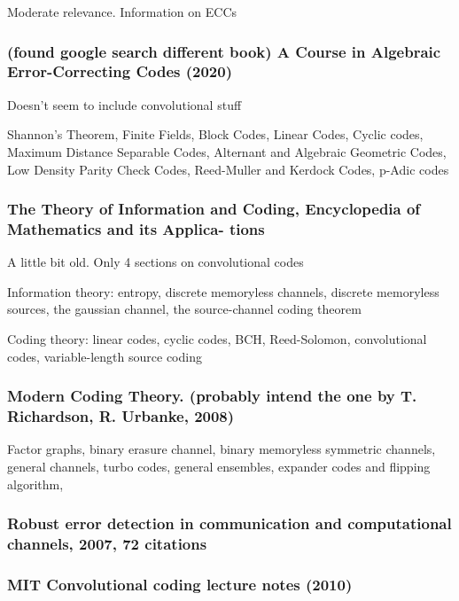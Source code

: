 \documentclass{article}
\begin{document}
Moderate relevance. Information on ECCs

\subsubsection{(found google search different book) A Course in Algebraic Error-Correcting Codes (2020)}

Doesn't seem to include convolutional stuff

Shannon's Theorem, Finite Fields, Block Codes, Linear Codes, Cyclic codes, Maximum Distance Separable Codes, Alternant and Algebraic Geometric Codes, Low Density Parity Check Codes, Reed-Muller and Kerdock Codes, p-Adic codes

\subsubsection{The Theory of Information and Coding, Encyclopedia of Mathematics and its Applica-
tions}

A little bit old. Only 4 sections on convolutional codes

Information theory: entropy, discrete memoryless channels, discrete memoryless sources, the gaussian channel, the source-channel coding theorem

Coding theory: linear codes, cyclic codes, BCH, Reed-Solomon, convolutional codes, variable-length source coding


\subsubsection{Modern Coding Theory. (probably intend the one by T. Richardson, R. Urbanke, 2008)}

Factor graphs, binary erasure channel, binary memoryless symmetric channels, general channels, turbo codes, general ensembles, expander codes and flipping algorithm,

\subsubsection{Robust error detection in communication and computational channels, 2007, 72 citations}

\subsubsection{MIT Convolutional coding lecture notes (2010)}
\end{document}
